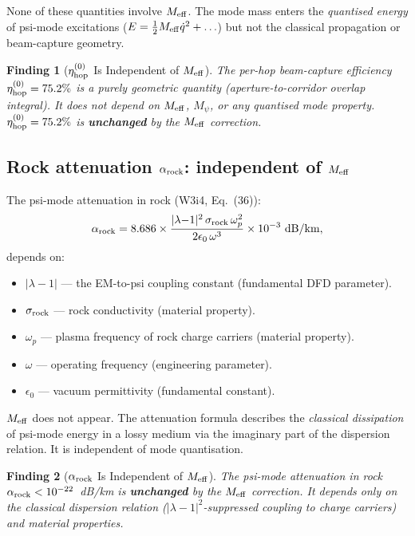 \documentclass[11pt]{article}
\newtheorem{finding}{Finding}
\newcommand{\Meff}{M_{\rm eff}}
\newcommand{\Mpsi}{M_\psi}
\newcommand{\lambdaone}{|\lambda{-}1|}
\newcommand{\etahop}{\eta_{\rm hop}}
\newcommand{\alpharock}{\alpha_{\rm rock}}
\begin{document}
None of these quantities involve $\Meff$. The mode mass enters the
\emph{quantised energy} of psi-mode excitations ($E = \frac{1}{2}\Meff\dot{q}^2
+ \ldots$) but not the classical propagation or beam-capture geometry.

\begin{finding}[$\etahop^{(0)}$ Is Independent of $\Meff$]
\label{find:eta-hop-Meff}
The per-hop beam-capture efficiency $\etahop^{(0)} = 75.2\%$ is a purely
geometric quantity (aperture-to-corridor overlap integral). It does not
depend on $\Meff$, $\Mpsi$, or any quantised mode property.
$\etahop^{(0)} = 75.2\%$ is \textbf{unchanged} by the $\Meff$ correction.
\end{finding}

\subsection{Rock attenuation $\alpharock$: independent of $\Meff$}

The psi-mode attenuation in rock (W3i4, Eq.~(36)):
\begin{equation}
\alpharock = 8.686 \times \frac{\lambdaone^2\,\sigma_{\rm rock}\,\omega_p^2}
{2\epsilon_0\,\omega^3} \times 10^{-3}~\text{dB/km},
\label{eq:alpha-rock}
\end{equation}
depends on:
\begin{itemize}
\item $\lambdaone$ --- the EM-to-psi coupling constant (fundamental DFD parameter).
\item $\sigma_{\rm rock}$ --- rock conductivity (material property).
\item $\omega_p$ --- plasma frequency of rock charge carriers (material property).
\item $\omega$ --- operating frequency (engineering parameter).
\item $\epsilon_0$ --- vacuum permittivity (fundamental constant).
\end{itemize}

$\Meff$ does not appear. The attenuation formula describes the \emph{classical
dissipation} of psi-mode energy in a lossy medium via the imaginary part of
the dispersion relation. It is independent of mode quantisation.

\begin{finding}[$\alpharock$ Is Independent of $\Meff$]
\label{find:alpha-rock-Meff}
The psi-mode attenuation in rock $\alpharock < 10^{-22}$~dB/km is
\textbf{unchanged} by the $\Meff$ correction. It depends only on the
classical dispersion relation ($\lambdaone^2$-suppressed coupling to
charge carriers) and material properties.
\end{finding}
\end{document}
